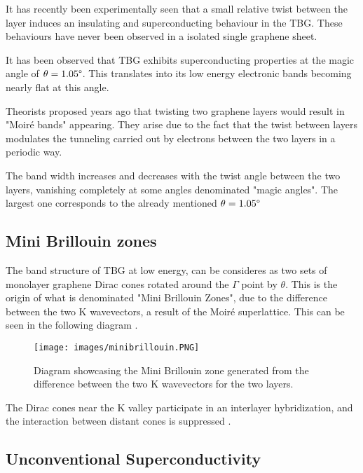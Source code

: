 \documentclass[a4paper,12pt]{report}
\begin{document}
It has recently been experimentally seen that a small relative twist between the layer induces an insulating and superconducting behaviour in the TBG. These behaviours have never been observed in a isolated single graphene sheet. 

It has been observed that TBG exhibits superconducting properties at the magic angle of $\theta = 1.05 \degree$. This translates into its low energy electronic bands becoming nearly flat at this angle.

Theorists proposed years ago that twisting two graphene layers would result in "Moiré bands" appearing. They arise due to the fact that the twist between layers modulates the tunneling carried out by electrons between the two layers in a periodic way.

The band width increases and decreases with the twist angle between the two layers, vanishing completely at some angles denominated "magic angles". The largest one corresponds to the already mentioned $\theta = 1.05 \degree$ 

\subsection{Mini Brillouin zones}

The band structure of TBG at low energy, can be consideres as two sets of monolayer graphene Dirac cones rotated around the $\Gamma$ point by $\theta$. This is the origin of what is denominated "Mini Brillouin Zones", due to the difference between the two K wavevectors, a result of the Moiré superlattice. This can be seen in the following diagram \cite{minibrillouin}. 

\begin{figure}[h]
	\begin{center}
		\texttt{[image: images/minibrillouin.PNG]}
	\end{center}
	\caption{Diagram showcasing the Mini Brillouin zone generated from the difference between the two K wavevectors for the two layers.} 
	\label{fig:cosmicray}
\end{figure}


The Dirac cones near the K valley participate in an interlayer hybridization, and the interaction between distant cones is suppressed \cite{diraccones}.

\subsection{Unconventional Superconductivity}
\end{document}
